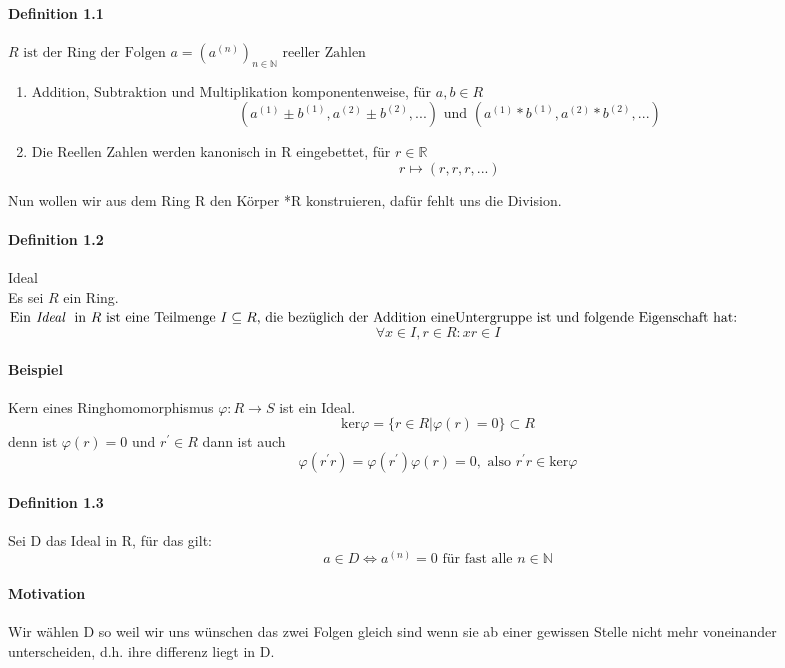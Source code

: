 \documentclass[a4paper]{article}
\begin{document}
\paragraph{Definition 1.1} $ R \text{ ist der Ring der Folgen }  a = (a^{(n)})_{n \in \mathbb{N}} \text{ reeller Zahlen} $
\begin{enumerate}
      \item Addition, Subtraktion und Multiplikation komponentenweise, für $a, b \in R$  
            $$ (a^{(1)} \pm b^{(1)}, a^{(2)} \pm b^{(2)},...) \text{ und } (a^{(1)} * b^{(1)}, a^{(2)} * b^{(2)},...) $$ 
      \item Die Reellen Zahlen werden kanonisch in R eingebettet, für $ r \in \mathbb{R} $ 
            $$ r \mapsto (r,r,r,...) $$
\end{enumerate}
\smallskip
Nun wollen wir aus dem Ring R den Körper *R konstruieren, dafür fehlt uns die Division. 


\paragraph{Definition 1.2} Ideal \\
Es sei $ R $ ein Ring. \\ 
$ \text{Ein} \textit{ Ideal } \text{ in } R \text{ ist eine Teilmenge } I \subseteq R \text{, die bezüglich der Addition 
eine} \\ \text{Untergruppe ist und folgende Eigenschaft hat:} $
$$ \forall x \in I, r \in R: xr \in I $$
\paragraph{Beispiel} Kern eines Ringhomomorphismus $ \varphi:R \to S $ ist ein Ideal. 
$$ \text{ker}\varphi = \{r \in R | \varphi(r) = 0\} \subset R $$
denn ist $ \varphi(r) = 0 $ und $ r^\prime \in R $ dann ist auch
$$ \varphi(r^\prime r) = \varphi(r^\prime) \varphi(r) = 0, \text{ also } r^\prime r \in \text{ker}\varphi $$


\paragraph{Definition 1.3} Sei D das Ideal in R, für das gilt:  
      $$ a \in D \iff a^{(n)} = 0 \text{ für fast alle } n \in \mathbb{N}  $$
\paragraph{Motivation} Wir wählen D so weil wir uns wünschen das zwei Folgen
gleich sind wenn sie ab einer gewissen Stelle nicht mehr voneinander unterscheiden,
d.h. ihre differenz liegt in D.   
\end{document}
